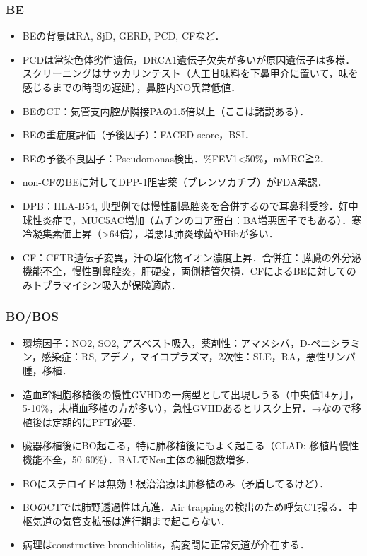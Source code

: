 \subsubsection{BE}

\begin{itemize}
\item BEの背景はRA, SjD, GERD, PCD, CFなど．
\item PCDは常染色体劣性遺伝，DRCA1遺伝子欠失が多いが原因遺伝子は多様．スクリーニングはサッカリンテスト（人工甘味料を下鼻甲介に置いて，味を感じるまでの時間の遅延），鼻腔内NO異常低値．
\item BEのCT：気管支内腔が隣接PAの1.5倍以上（ここは諸説ある）．
\item BEの重症度評価（予後因子）：FACED score，BSI．
\item BEの予後不良因子：Pseudomonas検出．\%FEV1<50\%，mMRC≧2．


\item non-CFのBEに対してDPP-1阻害薬（ブレンソカチブ）がFDA承認．
\item DPB：HLA-B54, 典型例では慢性副鼻腔炎を合併するので耳鼻科受診．好中球性炎症で，MUC5AC増加（ムチンのコア蛋白：BA増悪因子でもある）．寒冷凝集素価上昇（>64倍），増悪は肺炎球菌やHibが多い．
\item CF：CFTR遺伝子変異，汗の塩化物イオン濃度上昇．合併症：膵臓の外分泌機能不全，慢性副鼻腔炎，肝硬変，両側精管欠損．CFによるBEに対してのみトブラマイシン吸入が保険適応．
\end{itemize}


\subsubsection{BO/BOS}

\begin{itemize}
\item 環境因子：NO2, SO2, アスベスト吸入，薬剤性：アマメシバ，D-ペニシラミン，感染症：RS, アデノ，マイコプラズマ，2次性：SLE，RA，悪性リンパ腫，移植．
\item 造血幹細胞移植後の慢性GVHDの一病型として出現しうる（中央値14ヶ月，5-10\%，末梢血移植の方が多い），急性GVHDあるとリスク上昇．→なので移植後は定期的にPFT必要．
\item 臓器移植後にBO起こる，特に肺移植後にもよく起こる（CLAD: 移植片慢性機能不全，50-60\%）．BALでNeu主体の細胞数増多．
\item BOにステロイドは無効！根治治療は肺移植のみ（矛盾してるけど）．
\item BOのCTでは肺野透過性は亢進．Air trappingの検出のため呼気CT撮る．中枢気道の気管支拡張は進行期まで起こらない．
\item 病理はconstructive bronchiolitis，病変間に正常気道が介在する．
\end{itemize}


